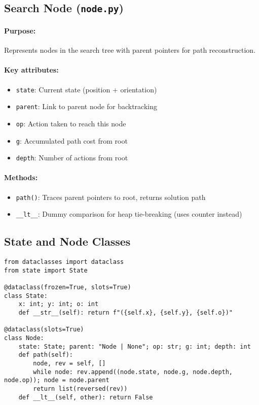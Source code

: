 \documentclass[11pt,a4paper]{article}
\begin{document}
\subsection{Search Node (\texttt{node.py})}
\paragraph{Purpose:} Represents nodes in the search tree with parent pointers for path reconstruction.

\paragraph{Key attributes:}
\begin{itemize}[leftmargin=1.5cm,itemsep=0.1em]
    \item \texttt{state}: Current state (position + orientation)
    \item \texttt{parent}: Link to parent node for backtracking
    \item \texttt{op}: Action taken to reach this node
    \item \texttt{g}: Accumulated path cost from root
    \item \texttt{depth}: Number of actions from root
\end{itemize}

\paragraph{Methods:}
\begin{itemize}[leftmargin=1.5cm,itemsep=0.1em]
    \item \texttt{path()}: Traces parent pointers to root, returns solution path
    \item \texttt{\_\_lt\_\_}: Dummy comparison for heap tie-breaking (uses counter instead)
\end{itemize}
\newpage
\subsection{State and Node Classes}
\begin{lstlisting}
from dataclasses import dataclass
from state import State

@dataclass(frozen=True, slots=True)
class State:
    x: int; y: int; o: int
    def __str__(self): return f"({self.x}, {self.y}, {self.o})"

@dataclass(slots=True)
class Node:
    state: State; parent: "Node | None"; op: str; g: int; depth: int
    def path(self):
        node, rev = self, []
        while node: rev.append((node.state, node.g, node.depth, node.op)); node = node.parent
        return list(reversed(rev))
    def __lt__(self, other): return False
\end{lstlisting}
\end{document}
